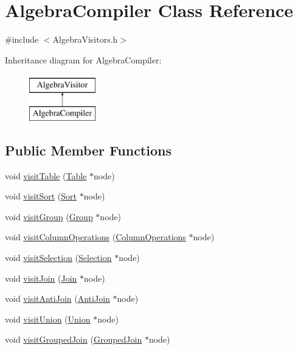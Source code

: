 \hypertarget{class_algebra_compiler}{\section{Algebra\+Compiler Class Reference}
\label{class_algebra_compiler}
}


{\ttfamily \#include $<$Algebra\+Visitors.\+h$>$}

Inheritance diagram for Algebra\+Compiler\+:\begin{figure}[H]
\begin{center}
\leavevmode
\includegraphics[height=2.000000cm]{class_algebra_compiler}
\end{center}
\end{figure}
\subsection*{Public Member Functions}
\begin{DoxyCompactItemize}
\item 
void \hyperlink{class_algebra_compiler_a5b2f264009e5ed18fcc28c739f67d48a}{visit\+Table} (\hyperlink{class_table}{Table} $\ast$node)
\item 
void \hyperlink{class_algebra_compiler_ab0a1083d8237aeb66e2d8e3c0baff201}{visit\+Sort} (\hyperlink{class_sort}{Sort} $\ast$node)
\item 
void \hyperlink{class_algebra_compiler_aaf1f80df836121f8f8b7abd01e7ac4dd}{visit\+Group} (\hyperlink{class_group}{Group} $\ast$node)
\item 
void \hyperlink{class_algebra_compiler_add29b612e4c40532405924b72f739092}{visit\+Column\+Operations} (\hyperlink{class_column_operations}{Column\+Operations} $\ast$node)
\item 
void \hyperlink{class_algebra_compiler_a22f8846f5665f898e8f67815abe64015}{visit\+Selection} (\hyperlink{class_selection}{Selection} $\ast$node)
\item 
void \hyperlink{class_algebra_compiler_a430ba2ac25d10e94b1408e23def965e6}{visit\+Join} (\hyperlink{class_join}{Join} $\ast$node)
\item 
void \hyperlink{class_algebra_compiler_a4903d8f81d9da91037ce65b6aaeb7fa4}{visit\+Anti\+Join} (\hyperlink{class_anti_join}{Anti\+Join} $\ast$node)
\item 
void \hyperlink{class_algebra_compiler_a6c5170534fba2aa8ed5899f92ceeee8f}{visit\+Union} (\hyperlink{class_union}{Union} $\ast$node)
\item 
void \hyperlink{class_algebra_compiler_acebcb46237fd029f910ae9d06718c1b4}{visit\+Grouped\+Join} (\hyperlink{class_grouped_join}{Grouped\+Join} $\ast$node)
\end{DoxyCompactItemize}
